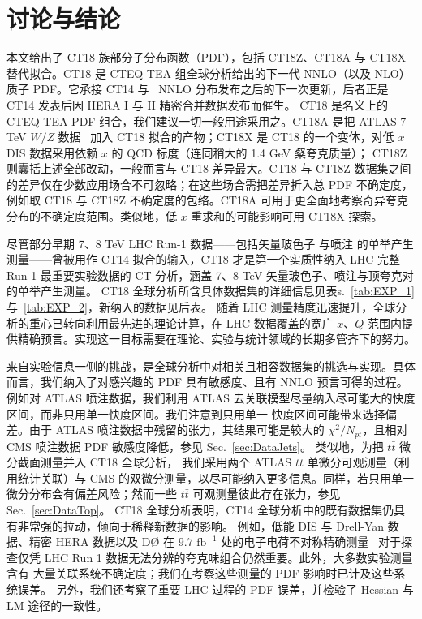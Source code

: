 \section{讨论与结论
\label{sec:Conclusions}
}

本文给出了 CT18 族部分子分布函数（PDF），包括 CT18Z、CT18A 与 CT18X 替代拟合。CT18 是 CTEQ-TEA 组全球分析给出的下一代 NNLO（以及 NLO）
质子 PDF。它承接 CT14 与 \CTHERAII~NNLO 分布发布之后的下一次更新，后者正是 CT14 发表后因 HERA I 与 II 精密合并数据发布而催生。
CT18 是名义上的 CTEQ-TEA PDF 组合，我们建议一切一般用途采用之。CT18A 是把 ATLAS 7 TeV $W/Z$ 数据~\cite{Aaboud:2016btc} 加入 CT18 拟合的产物；CT18X 是 CT18 的一个变体，对低 $x$ DIS 数据采用依赖 $x$ 的 QCD 标度（连同稍大的 1.4 GeV 粲夸克质量）；
CT18Z 则囊括上述全部改动，一般而言与 CT18 差异最大。CT18 与 CT18Z 数据集之间的差异仅在少数应用场合不可忽略；在这些场合需把差异折入总 PDF 不确定度，例如取 CT18 与 CT18Z 不确定度的包络。CT18A 可用于更全面地考察奇异夸克分布的不确定度范围。类似地，低 $x$ 重求和的可能影响可用 CT18X 探索。

尽管部分早期 7、8 TeV LHC Run-1 数据——包括矢量玻色子
\cite{Aaij:2012vn, Chatrchyan:2013mza, Chatrchyan:2012xt, Aad:2011dm} 与喷注 \cite{Aad:2011fc, Chatrchyan:2012bja} 的单举产生测量——曾被用作 CT14 拟合的输入，CT18 才是第一个实质性纳入 LHC 完整 Run-1 最重要实验数据的 CT 分析，涵盖 7、8 TeV 矢量玻色子、喷注与顶夸克对的单举产生测量。
CT18 全球分析所含具体数据集的详细信息见表s.~\ref{tab:EXP_1} 与~\ref{tab:EXP_2}，新纳入的数据见后表。
随着 LHC 测量精度迅速提升，全球分析的重心已转向利用最先进的理论计算，在 LHC 数据覆盖的宽广 $x$、$Q$ 范围内提供精确预言。实现这一目标需要在理论、实验与统计领域的长期多管齐下的努力。

来自实验信息一侧的挑战，是全球分析中对相关且相容数据集的挑选与实现。具体而言，我们纳入了对感兴趣的 PDF 具有敏感度、且有 NNLO 预言可得的过程。
例如对 ATLAS 喷注数据，我们利用 ATLAS 去关联模型尽量纳入尽可能大的快度区间，而非只用单一快度区间。我们注意到只用单一
快度区间可能带来选择偏差。由于 ATLAS 喷注数据中残留的张力，其结果可能是较大的 $\chi^2 / N_\mathit{pt}$，且相对 CMS 喷注数据 PDF 敏感度降低，参见 Sec.~\ref{sec:DataJets}。
类似地，为把 $t \bar t$ 微分截面测量并入 CT18 全球分析，
我们采用两个 ATLAS $t \bar t$ 单微分可观测量（利用统计关联）与 CMS 的双微分测量，以尽可能纳入更多信息。同样，若只用单一微分分布会有偏差风险；然而一些 $t\bar t$ 可观测量彼此存在张力，参见 Sec.~\ref{sec:DataTop}。
CT18 全球分析表明，CT14 全球分析中的既有数据集仍具有非常强的拉动，倾向于稀释新数据的影响。
例如，低能 DIS 与 Drell-Yan 数据、精密 HERA 数据以及 D\O{} 在 $9.7\mbox{ fb}^{-1}$
处的电子电荷不对称精确测量~\cite{D0:2014kma} 对于探查仅凭 LHC Run 1 数据无法分辨的夸克味组合仍然重要。此外，大多数实验测量含有
大量关联系统不确定度；我们在考察这些测量的 PDF 影响时已计及这些系统误差。
另外，我们还考察了重要 LHC 过程的 PDF 误差，并检验了 Hessian 与 LM 途径的一致性。

